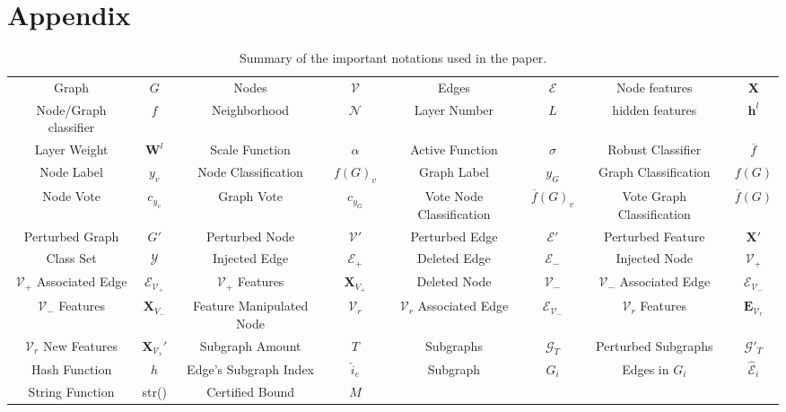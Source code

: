 \section*{Appendix}


\begin{table*}[!t]
\label{tbl:notations}
    \footnotesize
    \centering 
    \renewcommand\arraystretch{1.3}
    \begin{tabular}{c|c|c|c|c|c|c|c}
     \toprule
    Graph&$G$&Nodes&$\mathcal{V}$&Edges&$\mathcal{E}$&Node features&$\mathbf{X}$\\
    \cline{1-8} 
    Node/Graph classifier&$f$&Neighborhood&$\mathcal{N}$&Layer Number&$L$&hidden features&$\mathbf{h}^{l}$\\
    \cline{1-8} 
    Layer Weight&$\mathbf{W}^{l}$&Scale Function&$\alpha$&Active Function&$\sigma$&Robust Classifier&$\overline{f}$\\
    \cline{1-8}
    Node Label&$y_{v}$&Node Classification&$f(G)_{v}$&Graph Label&$y_{G}$&Graph Classification&$f(G)$\\
    \cline{1-8}
    Node Vote&$c_{y_{v}}$&Graph Vote&$c_{y_{G}}$&Vote Node Classification&$\overline{f}(G)_{v}$&Vote Graph Classification&$\overline{f}(G)$\\
    \cline{1-8}
    Perturbed Graph&$G'$&Perturbed Node&$\mathcal{V}'$&Perturbed Edge&$\mathcal{E}'$&Perturbed Feature&$\mathbf{X}'$\\
    \cline{1-8}
    Class Set&$\mathcal{Y}$&Injected Edge&$\mathcal{E}_{+}$&Deleted Edge&$\mathcal{E}_{-}$&Injected Node&$\mathcal{V}_{+}$\\
    \cline{1-8}
    $\mathcal{V}_{+}$ Associated Edge&$\mathcal{E}_{\mathcal{V}_{+}}$&$\mathcal{V}_{+}$ Features&$\mathbf{X}_{{V}_{+}}$&Deleted Node&$\mathcal{V}_{-}$&$\mathcal{V}_{-}$ Associated Edge&$\mathcal{E}_{\mathcal{V}_{-}}$\\
    \cline{1-8} 
    $\mathcal{V}_{-}$ Features&$\mathbf{X}_{{V}_{-}}$&Feature Manipulated Node&$\mathcal{V}_{r}$&$\mathcal{V}_{r}$ Associated Edge&$\mathcal{E}_{\mathcal{V}_{-}}$&$\mathcal{V}_{r}$ Features&$\mathbf{E}_{\mathcal{V}_{r}}$\\
    \cline{1-8}
    $\mathcal{V}_{r}$ New Features&$\mathbf{X}_{\mathcal{V}_{r}}'$&Subgraph Amount&$T$&Subgraphs&$\mathcal{G}_{T}$&Perturbed Subgraphs &$\mathcal{G}'_{T}$\\
    \cline{1-8}
    Hash Function&$h$&Edge's Subgraph Index&$\hat{i}_{e}$&Subgraph&$G_{i}$&Edges in $G_{i}$&$\hat{\mathcal{E}}_{i}$\\
    \cline{1-8}
    String Function& str()&Certified Bound&$M$\\
 \bottomrule
    \end{tabular}
        \caption{Summary of the important notations used in the paper.}
    \label{tbl:notations}
\end{table*}




